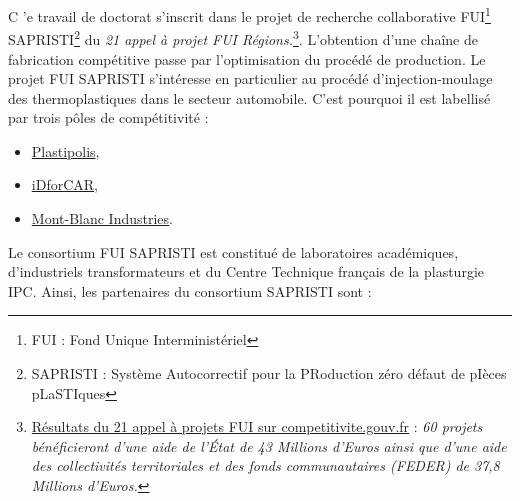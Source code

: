 
\lettrine[lines=1]{C}{ }'e travail de doctorat s'inscrit dans le projet de recherche collaborative FUI\footnote{FUI : Fond Unique Interministériel} SAPRISTI\footnote{SAPRISTI : Système Autocorrectif pour la PRoduction zéro défaut de pIèces pLaSTIques} du \textit{21 appel à projet FUI Régions.}\footnote{\href{https://competitivite.gouv.fr/les-appels-a-projets-de-r-d-fui/le-21e-appel-a-projets/les-resultats-du-21e-appel-a-projets-787.html}{Résultats du 21 appel à projets FUI sur competitivite.gouv.fr} : \textit{60 projets bénéficieront d’une aide de l’État de 43 Millions d'Euros ainsi que d’une aide des collectivités territoriales et des fonds communautaires (FEDER) de 37,8 Millions d'Euros.}}.
L’obtention d’une chaîne de fabrication compétitive passe par l’optimisation du procédé de production.
Le projet FUI SAPRISTI s'intéresse en particulier au procédé d'injection-moulage des thermoplastiques dans le secteur automobile.
C'est pourquoi il est labellisé par trois pôles de compétitivité :
\begin{itemize}
	\item \href{http://www.plastipolis.fr/}{Plastipolis},
	\item \href{https://www.id4car.org}{iDforCAR},
	\item \href{https://www.montblancindustries.com/}{Mont-Blanc Industries}.
\end{itemize}
\noindent
Le consortium FUI SAPRISTI est constitué de laboratoires académiques, d'industriels transformateurs et du Centre Technique français de la plasturgie IPC.
Ainsi, les partenaires du consortium SAPRISTI sont :
